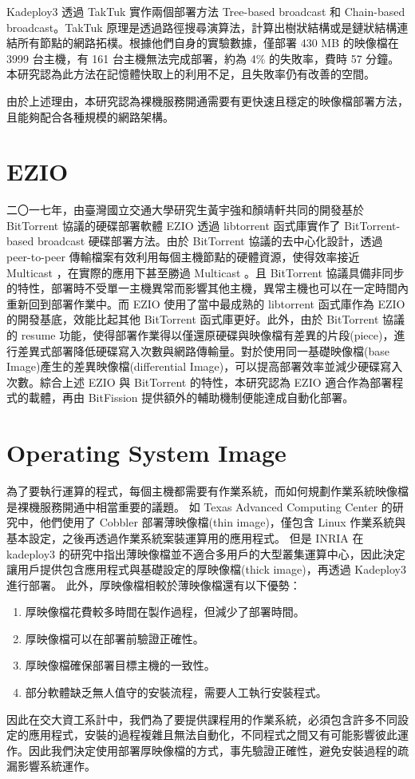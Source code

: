 Kadeploy3 透過 TakTuk 實作兩個部署方法 Tree-based broadcast 和 Chain-based broadcast。TakTuk 原理是透過路徑搜尋演算法，計算出樹狀結構或是鏈狀結構連結所有節點的網路拓樸。根據他們自身的實驗數據\cite{sarzyniec2012scalability}，僅部署 430 MB 的映像檔在 3999 台主機，有 161 台主機無法完成部署，約為 4\% 的失敗率，費時 57 分鐘。本研究認為此方法在記憶體快取上的利用不足，且失敗率仍有改善的空間。


由於上述理由，本研究認為裸機服務開通需要有更快速且穩定的映像檔部署方法，且能夠配合各種規模的網路架構。

\section{EZIO}
二〇一七年，由臺灣國立交通大學研究生黃宇強和顏靖軒共同的開發基於 BitTorrent 協議的硬碟部署軟體 EZIO\cite{ezio} 透過 libtorrent 函式庫實作了 BitTorrent-based broadcast 硬碟部署方法。由於 BitTorrent 協議的去中心化設計，透過 peer-to-peer 傳輸檔案有效利用每個主機節點的硬體資源，使得效率接近 Multicast ，在實際的應用下甚至勝過 Multicast 。且 BitTorrent 協議具備非同步的特性，部署時不受單一主機異常而影響其他主機，異常主機也可以在一定時間內重新回到部署作業中。而 EZIO 使用了當中最成熟的 libtorrent 函式庫作為 EZIO 的開發基底，效能比起其他 BitTorrent 函式庫更好。此外，由於 BitTorrent 協議的 resume 功能，使得部署作業得以僅還原硬碟與映像檔有差異的片段(piece)，進行差異式部署降低硬碟寫入次數與網路傳輸量。對於使用同一基礎映像檔(base Image)產生的差異映像檔(differential Image)，可以提高部署效率並減少硬碟寫入次數。綜合上述 EZIO 與 BitTorrent 的特性，本研究認為 EZIO 適合作為部署程式的載體，再由 BitFission 提供額外的輔助機制便能達成自動化部署。

\section{Operating System Image}
為了要執行運算的程式，每個主機都需要有作業系統，而如何規劃作業系統映像檔是裸機服務開通中相當重要的議題。
如 Texas Advanced Computing Center 的研究\cite{mclay2011best}中，他們使用了 Cobbler 部署薄映像檔(thin image)，僅包含 Linux 作業系統與基本設定，之後再透過作業系統案裝運算用的應用程式。
但是 INRIA 在 kadeploy3 的研究中\cite{kadeploy3}指出薄映像檔並不適合多用戶的大型叢集運算中心，因此決定讓用戶提供包含應用程式與基礎設定的厚映像檔(thick image)，再透過 Kadeploy3 進行部署。
此外，厚映像檔相較於薄映像檔還有以下優勢：
\begin{enumerate}
\item 厚映像檔花費較多時間在製作過程，但減少了部署時間。
\item 厚映像檔可以在部署前驗證正確性。
\item 厚映像檔確保部署目標主機的一致性。
\item 部分軟體缺乏無人值守的安裝流程，需要人工執行安裝程式。
\end{enumerate}
因此在交大資工系計中，我們為了要提供課程用的作業系統，必須包含許多不同設定的應用程式，安裝的過程複雜且無法自動化，不同程式之間又有可能影響彼此運作。因此我們決定使用部署厚映像檔的方式，事先驗證正確性，避免安裝過程的疏漏影響系統運作。


